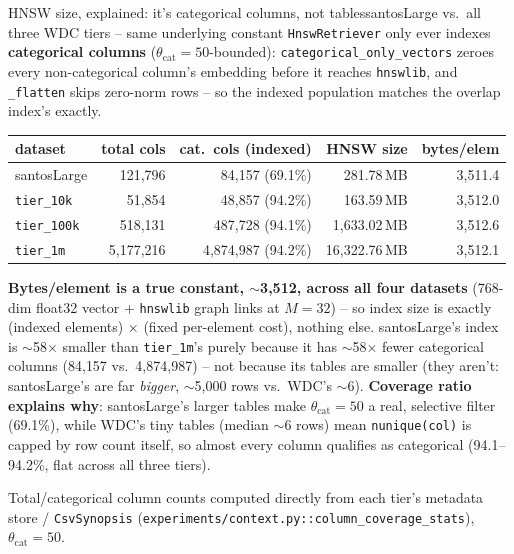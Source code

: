 \documentclass[aspectratio=169,10pt]{beamer}
\newcommand{\highlight}[1]{{\color{Cat1}\bfseries #1}}
\begin{document}
\begin{frame}{HNSW size, explained: it's categorical columns, not tables}{santosLarge vs.\ all three WDC tiers -- same underlying constant}
\small
\texttt{HnswRetriever} only ever indexes \highlight{categorical columns} ($\theta_{\mathrm{cat}}{=}50$-bounded): \texttt{categorical\_only\_vectors} zeroes every non-categorical column's embedding before it reaches \texttt{hnswlib}, and \texttt{\_flatten} skips zero-norm rows -- so the indexed population matches the overlap index's exactly.

\vspace{4pt}
\begin{center}
\begin{tabular}{lrrrr}
\toprule
dataset & total cols & \textbf{cat.\ cols (indexed)} & HNSW size & bytes/elem \\
\midrule
santosLarge & 121{,}796 & 84{,}157 (69.1\%) & 281.78\,MB & 3{,}511.4 \\
\texttt{tier\_10k} & 51{,}854 & 48{,}857 (94.2\%) & 163.59\,MB & 3{,}512.0 \\
\texttt{tier\_100k} & 518{,}131 & 487{,}728 (94.1\%) & 1{,}633.02\,MB & 3{,}512.6 \\
\texttt{tier\_1m} & 5{,}177{,}216 & 4{,}874{,}987 (94.2\%) & 16{,}322.76\,MB & 3{,}512.1 \\
\bottomrule
\end{tabular}
\end{center}

\vspace{6pt}
\highlight{Bytes/element is a true constant, $\sim$3{,}512, across all four datasets} (768-dim float32 vector + \texttt{hnswlib} graph links at $M{=}32$) -- so index size is exactly (indexed elements) $\times$ (fixed per-element cost), nothing else. santosLarge's index is $\sim$58$\times$ smaller than \texttt{tier\_1m}'s purely because it has $\sim$58$\times$ fewer categorical columns (84{,}157 vs.\ 4{,}874{,}987) -- not because its tables are smaller (they aren't: santosLarge's are far \emph{bigger}, $\sim$5{,}000 rows vs.\ WDC's $\sim$6). \highlight{Coverage ratio explains why}: santosLarge's larger tables make $\theta_{\mathrm{cat}}{=}50$ a real, selective filter (69.1\%), while WDC's tiny tables (median $\sim$6 rows) mean \texttt{nunique(col)} is capped by row count itself, so almost every column qualifies as categorical (94.1--94.2\%, flat across all three tiers).

\vspace{2pt}
{\footnotesize\color{Muted} Total/categorical column counts computed directly from each tier's metadata store / \texttt{CsvSynopsis} (\texttt{experiments/context.py::column\_coverage\_stats}), $\theta_{\mathrm{cat}}{=}50$.}
\end{frame}
\end{document}
